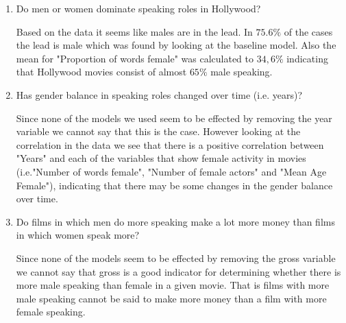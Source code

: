 \documentclass[../../project.tex]{subfiles}
\begin{document}
\begin{enumerate}
    \item Do men or women dominate speaking roles in Hollywood?
       
        Based on the data it seems like males are in the lead. In $75.6\%$ of the cases the lead is male which was found by looking at the baseline model. Also the mean for "Proportion of words female" was calculated to $34,6\%$ indicating that Hollywood movies consist of almost $65\%$ male speaking.
    \item Has gender balance in speaking roles changed over time (i.e. years)?
        
        Since none of the models we used seem to be effected by removing the year variable we cannot say that this is the case. However looking at the correlation in the data we see that there is a positive correlation between "Years" and each of the variables that show female activity in movies (i.e."Number of words female", "Number of female actors" and "Mean Age Female"), indicating that there may be some changes in the gender balance over time.
    \item Do films in which men do more speaking make a lot more money than films in which women speak more? 
    
    Since none of the models seem to be effected by removing the gross variable we cannot say that gross is a good indicator for determining whether there is more male speaking than female in a given movie. That is films with more male speaking cannot be said to make more money than a film with more female speaking. 
    
\end{enumerate}
	
	
	
	
\end{document}
